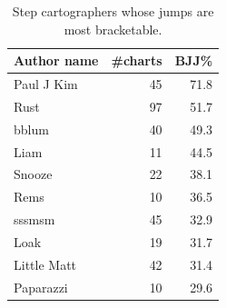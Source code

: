 \documentclass[10pt]{sigplanconf}
\begin{document}
\begin{table}[t]
	\begin{center}
		\small
	\begin{tabular}{l|r|r}
		\bf Author name & \bf \#charts & \bf BJJ\% \\
		\hline
		Paul J Kim & 45 & 71.8 \\
		Rust & 97 & 51.7 \\
		bblum & 40 & 49.3 \\
		Liam & 11 & 44.5 \\
		Snooze & 22 & 38.1 \\
		Rems & 10 & 36.5 \\
		sssmsm & 45 & 32.9 \\
		Loak & 19 & 31.7 \\
		Little Matt & 42 & 31.4 \\
		Paparazzi & 10 & 29.6 \\
	\end{tabular}
	\end{center}
	\caption{Step cartographers whose jumps are most bracketable.}
	\label{tab:author-bjj}
\end{table}

\end{document}
